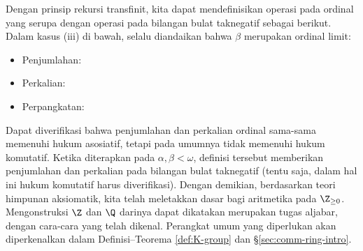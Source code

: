 Dengan prinsip rekursi transfinit, kita dapat mendefinisikan operasi pada ordinal yang serupa dengan operasi pada bilangan bulat taknegatif sebagai berikut. Dalam kasus (iii) di bawah, selalu diandaikan bahwa $\beta$ merupakan ordinal limit:
\begin{itemize}
	\item Penjumlahan: \begin{inparaenum}[(i)] \item $\alpha + 0 := \alpha$,  \item $\alpha + (\beta + 1) = (\alpha + \beta) + 1$, \item $\alpha + \beta = \sup\{ \alpha + \xi : \xi < \beta\}$. \end{inparaenum}
	\item Perkalian: \begin{inparaenum}[(i)] \item $\alpha \cdot 0 := 0$, \item $\alpha \cdot (\beta + 1) = \alpha \cdot \beta + \alpha$, \item $\alpha \cdot \beta = \sup\{\alpha \cdot \xi : \xi < \beta\}$. \end{inparaenum}
	\item Perpangkatan: \begin{inparaenum}[(i)] \item $\alpha^0 := 1$, \item $\alpha^{\beta + 1} = \alpha^\beta \cdot \alpha$, \item $\alpha^\beta = \sup\{\alpha^\xi : \xi < \beta\}$. \end{inparaenum}
\end{itemize}
Dapat diverifikasi bahwa penjumlahan dan perkalian ordinal sama-sama memenuhi hukum asosiatif, tetapi pada umumnya tidak memenuhi hukum komutatif. Ketika diterapkan pada $\alpha, \beta < \omega$, definisi tersebut memberikan penjumlahan dan perkalian pada bilangan bulat taknegatif (tentu saja, dalam hal ini hukum komutatif harus diverifikasi). Dengan demikian, berdasarkan teori himpunan aksiomatik, kita telah meletakkan dasar bagi aritmetika pada $\Z_{\geq 0}$. Mengonstruksi $\Z$ dan $\Q$ darinya dapat dikatakan merupakan tugas aljabar, dengan cara-cara yang telah dikenal. Perangkat umum yang diperlukan akan diperkenalkan dalam Definisi--Teorema \ref{def:K-group} dan \S\ref{sec:comm-ring-intro}.

